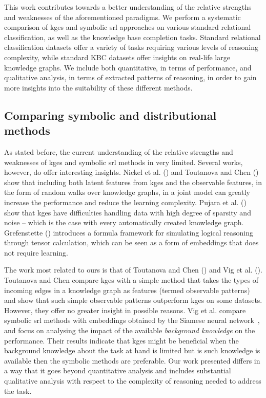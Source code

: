 This work contributes towards a better understanding of the relative strengths and weaknesses of the aforementioned paradigms.
We perform a systematic comparison of \gls{kge}s and symbolic \gls{srl} approaches on various standard relational classification, as well as the knowledge base completion tasks.
Standard relational classification datasets offer a variety of tasks requiring various levels of reasoning complexity, while standard KBC datasets offer insights on real-life large knowledge graphs.
We include both quantitative, in terms of performance, and qualitative analysis, in terms of extracted patterns of reasoning, in order to gain more insights into the suitability of these different methods.









\subsection{Comparing symbolic and distributional methods}


As stated before, the current understanding of the relative strengths and weaknesses of \gls{kge}s and symbolic \gls{srl} methods in very limited.
Several works, however, do offer interesting insights.
Nickel et al. (\cite{NickleNIPS2014}) and Toutanova and Chen (\cite{toutanova2015observed}) show that including both latent features from \gls{kge}s and the observable features, in the form of random walks over knowledge graphs, in a joint model can greatly increase the performance and reduce the learning complexity.
Pujara et al. (\cite{pujara:emnlp17}) show that \gls{kge}s have difficulties handling data with high degree of sparsity and noise -- which is the case with every automatically created knowledge graph.
Grefenstette (\cite{GrefenstetteTFDS}) introduces a formula framework for simulating logical reasoning through tensor calculation, which can be seen as a form of embeddings that does not require learning.


The work most related to ours is that of Toutanova and Chen (\cite{toutanova2015observed}) and Vig et al. (\cite{VigILP2017}).
Toutanova and Chen compare \gls{kge}s with a simple method that takes the types of incoming edges in a knowledge graph as features (termed observable patterns) and show that such simple observable patterns outperform \gls{kge}s on some datasets.
However, they offer no greater insight in possible reasons.
Vig et al.  compare symbolic \gls{srl} methods with embeddings obtained by the Siamese neural network~\cite{Bromley:1993:SVU:2987189.2987282}, and focus on analysing the impact of the available \textit{background knowledge} on the performance.
Their results indicate that \gls{kge}s might be beneficial when the background knowledge about the task at hand is limited but is such knowledge is available then the symbolic methods are preferable.
Our work presented differs in a way that it goes beyond quantitative analysis and includes substantial qualitative analysis with respect to the complexity of reasoning needed to address the task.



